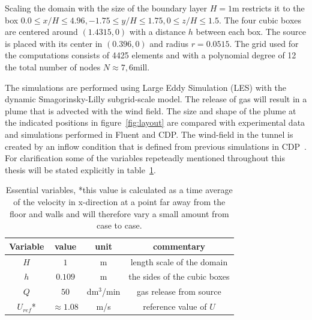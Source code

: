 Scaling the domain with the size of the boundary layer $H =1$m restricts it to
the box $0.0\leq x/H \leq 4.96,-1.75\leq y/H \leq 1.75, 0\leq z/H \leq 1.5$.
The four cubic boxes are centered around $(1.4315,0)$ with a distance $h$ between each box.
The source is placed with its center in $(0.396,0)$ and radius $r = 0.0515$.
The grid used for the computations consists of 4425 elements and with a polynomial degree of
12 the total number of nodes $N\approx 7,6$mill. 

The simulations are performed using Large Eddy Simulation (LES) 
with the dynamic Smagorinsky-Lilly subgrid-scale model. 
The release of gas will result in a plume that is advected with the wind field. The size and 
shape of the plume at the indicated positions in figure~\ref{fig:layout} are compared with 
experimental data and simulations performed in Fluent and CDP\@. 
The wind-field in the tunnel is created by an inflow condition that is defined from previous 
simulations in CDP~\cite{eriksson}.
For clarification some of the variables repeteadly mentioned throughout this thesis will be 
stated explicitly in table~\ref{tab:variables}.
\begin{table}
    \centering
    \begin{tabular}{c c c c}
        Variable & value & unit & commentary \\ \hline
        $H$   & $1$ & m & length scale of the domain \\ 
        $h$   & $0.109$ & m & the sides of the cubic boxes\\ 
        $Q$   & $50$ & dm$^3$/min & gas release from source \\ 
        $U_{ref} $*& $\approx1.08$ & m/s & reference value of $U$ \\
    \end{tabular}
    \caption{Essential variables, *this value is calculated as a time average of the velocity in 
        x-direction at a point far away from the floor and walls and will therefore 
        vary a small amount from case to case. }
    \label{tab:variables}
\end{table}


